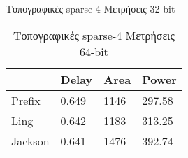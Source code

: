 \begin{multicols}{2}
\begin{table}[H]
\caption{Τοπογραφικές sparse-4 Μετρήσεις 32-bit}
\label{topo_sparse4_result_table_32}
\end{table}
\begin{table}[H]
\centering
     \begin{tabular}{||p{1.2cm} | p{0.7cm} p{1cm} p{1cm} ||} 
        \hline
         & Delay & Area & Power \\ [0.5ex] 
        \hline\hline
        Prefix & 0.649 & 1146 & 297.58 \\
        \hline
        Ling & 0.642 & 1183 & 313.25 \\
        \hline
        Jackson & 0.641 & 1476 & 392.74 \\
        \hline
    \end{tabular}
\caption{Τοπογραφικές sparse-4 Μετρήσεις 64-bit}
\label{topo sparse4_result_table_64}
\end{table}
\end{multicols}





